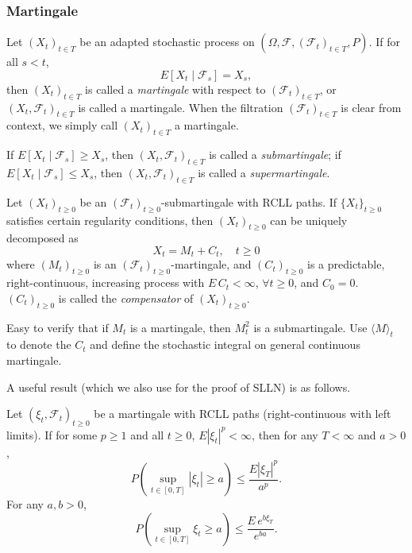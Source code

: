 \subsubsection{Martingale}
\begin{defn}[Martingale]
Let $(X_t)_{t \in T}$ be an adapted stochastic process on $(\Omega, \mathcal{F}, (\mathcal{F}_t)_{t \in T}, P)$. If for all $s < t$,
\[
E[X_t \mid \mathcal{F}_s] = X_s,
\]
then $(X_t)_{t \in T}$ is called a \textit{martingale} with respect to $(\mathcal{F}_t)_{t \in T}$, or $(X_t, \mathcal{F}_t)_{t \in T}$ is called a martingale. When the filtration $(\mathcal{F}_t)_{t \in T}$ is clear from context, we simply call $(X_t)_{t \in T}$ a martingale.

If $E[X_t \mid \mathcal{F}_s] \geq X_s$, then $(X_t, \mathcal{F}_t)_{t \in T}$ is called a \textit{submartingale}; if $E[X_t \mid \mathcal{F}_s] \leq X_s$, then $(X_t, \mathcal{F}_t)_{t \in T}$ is called a \textit{supermartingale}.
\end{defn}

\begin{defn}
Let $(X_t)_{t \geq 0}$ be an $(\mathcal{F}_t)_{t \geq 0}$-submartingale with RCLL paths. If $\{X_t\}_{t \geq 0}$ satisfies certain regularity conditions, then $(X_t)_{t \geq 0}$ can be uniquely decomposed as
\[
X_t = M_t + C_t, \quad t \geq 0
\]
where $(M_t)_{t \geq 0}$ is an $(\mathcal{F}_t)_{t \geq 0}$-martingale, and $(C_t)_{t \geq 0}$ is a predictable, right-continuous, increasing process with $E\, C_t < \infty$, $\forall t \geq 0$, and $C_0 = 0$. $(C_t)_{t \geq 0}$ is called the \textit{compensator} of $(X_t)_{t \geq 0}$.
\end{defn}

\begin{rem}
    Easy to verify that if $M_t$ is a martingale, then $M_t^2$ is a submartingale. Use $\langle M\rangle_t$ to denote the $C_t$ and define the stochastic integral on general continuous martingale.
\end{rem}

A useful result (which we also use for the proof of SLLN) is as follows.
\begin{thm}
Let $(\xi_t, \mathcal{F}_t)_{t \geq 0}$ be a martingale with RCLL paths (right-continuous with left limits). If for some $p \geq 1$ and all $t \geq 0$, $E|\xi_t|^p < \infty$, then for any $T < \infty$ and $a > 0$,
\[
P\left(\sup_{t \in [0,T]} |\xi_t| \geq a\right) \leq \frac{E|\xi_T|^p}{a^p}.
\]
For any $a, b > 0$,
\[
P\left(\sup_{t \in [0,T]} \xi_t \geq a\right) \leq \frac{E\, e^{b\xi_T}}{e^{ba}}.
\]
\end{thm}


